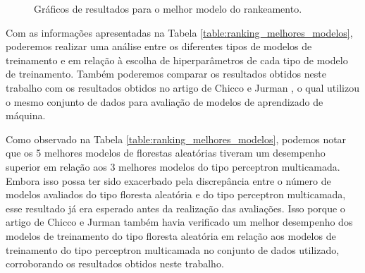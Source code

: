 \begin{figure}[h]
{    \label{fig:best_results_boxplot}
  }
	\caption{Gráficos de resultados para o melhor modelo do rankeamento.}
	\label{fig:best_results_plot}
\end{figure}

Com as informações apresentadas na Tabela \ref{table:ranking_melhores_modelos}, poderemos realizar uma análise entre os diferentes tipos de modelos de treinamento e em relação à escolha de hiperparâmetros de cada tipo de modelo de treinamento. Também poderemos comparar os resultados obtidos neste trabalho com os resultados obtidos no artigo de Chicco e Jurman \cite{chicco2020}, o qual utilizou o mesmo conjunto de dados \cite{larxel_dataset} para avaliação de modelos de aprendizado de máquina.

Como observado na Tabela \ref{table:ranking_melhores_modelos}, podemos notar que os 5 melhores modelos de florestas aleatórias tiveram um desempenho superior em relação aos 3 melhores modelos do tipo perceptron multicamada. Embora isso possa ter sido exacerbado pela discrepância entre o número de modelos avaliados do tipo floresta aleatória e do tipo perceptron multicamada, esse resultado já era esperado antes da realização das avaliações. Isso porque o artigo de Chicco e Jurman também havia verificado um melhor desempenho dos modelos de treinamento do tipo floresta aleatória em relação aos modelos de treinamento do tipo perceptron multicamada no conjunto de dados utilizado, corroborando os resultados obtidos neste trabalho.


